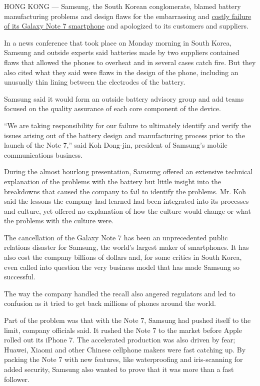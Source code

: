 HONG KONG --- Samsung, the South Korean conglomerate, blamed battery
manufacturing problems and design flaws for the embarrassing and
\href{https://www.nytimes3xbfgragh.onion/2016/10/12/business/international/samsung-galaxy-note7-terminated.html?_r=0}{costly
failure of its Galaxy Note 7 smartphone} and apologized to its customers
and suppliers.

In a news conference that took place on Monday morning in South Korea,
Samsung and outside experts said batteries made by two suppliers
contained flaws that allowed the phones to overheat and in several cases
catch fire. But they also cited what they said were flaws in the design
of the phone, including an unusually thin lining between the electrodes
of the battery.

Samsung said it would form an outside battery advisory group and add
teams focused on the quality assurance of each core component of the
device.

``We are taking responsibility for our failure to ultimately identify
and verify the issues arising out of the battery design and
manufacturing process prior to the launch of the Note 7,'' said Koh
Dong-jin, president of Samsung's mobile communications business.

During the almost hourlong presentation, Samsung offered an extensive
technical explanation of the problems with the battery but little
insight into the breakdowns that caused the company to fail to identify
the problems. Mr. Koh said the lessons the company had learned had been
integrated into its processes and culture, yet offered no explanation of
how the culture would change or what the problems with the culture were.

The cancellation of the Galaxy Note 7 has been an unprecedented public
relations disaster for Samsung, the world's largest maker of
smartphones. It has also cost the company billions of dollars and, for
some critics in South Korea, even called into question the very business
model that has made Samsung so successful.

The way the company handled the recall also angered regulators and led
to confusion as it tried to get back millions of phones around the
world.

Part of the problem was that with the Note 7, Samsung had pushed itself
to the limit, company officials said. It rushed the Note 7 to the market
before Apple rolled out its iPhone 7. The accelerated production was
also driven by fear; Huawei, Xiaomi and other Chinese cellphone makers
were fast catching up. By packing the Note 7 with new features, like
waterproofing and iris-scanning for added security, Samsung also wanted
to prove that it was more than a fast follower.

